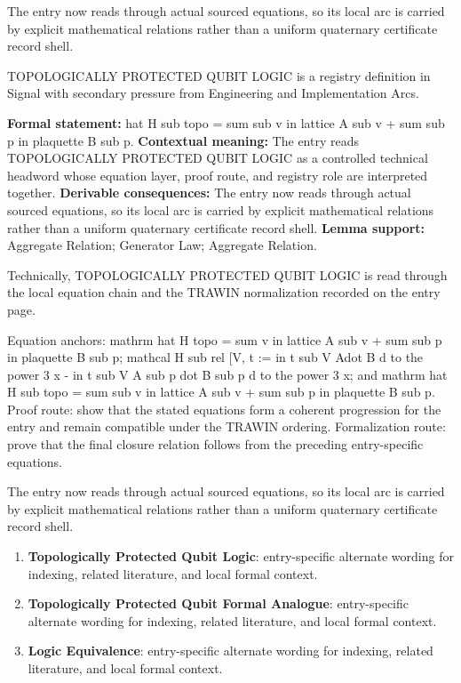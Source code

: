 The entry now reads through actual sourced equations, so its local arc is carried by explicit mathematical relations rather than a uniform quaternary certificate record shell.
\clearpage


\begingroup\small
{}
TOPOLOGICALLY PROTECTED QUBIT LOGIC is a registry definition in Signal with secondary pressure from Engineering and Implementation Arcs.

\begingroup\footnotesize\setlength{\emergencystretch}{3em}\sloppy
\textbf{Formal statement:} hat H sub topo = sum sub v in lattice A sub v + sum sub p in plaquette B sub p. \textbf{Contextual meaning:} The entry reads TOPOLOGICALLY PROTECTED QUBIT LOGIC as a controlled technical headword whose equation layer, proof route, and registry role are interpreted together. \textbf{Derivable consequences:} The entry now reads through actual sourced equations, so its local arc is carried by explicit mathematical relations rather than a uniform quaternary certificate record shell. \textbf{Lemma support:} Aggregate Relation; Generator Law; Aggregate Relation.\par
\endgroup

Technically, TOPOLOGICALLY PROTECTED QUBIT LOGIC is read through the local equation chain and the TRAWIN normalization recorded on the entry page.

Equation anchors: mathrm hat H topo = sum v in lattice A sub v + sum sub p in plaquette B sub p; mathcal H sub rel [V, t := in t sub V Adot B d to the power 3 x - in t sub V A sub p dot B sub p d to the power 3 x; and mathrm hat H sub topo = sum sub v in lattice A sub v + sum sub p in plaquette B sub p. Proof route: show that the stated equations form a coherent progression for the entry and remain compatible under the TRAWIN ordering. Formalization route: prove that the final closure relation follows from the preceding entry-specific equations.

The entry now reads through actual sourced equations, so its local arc is carried by explicit mathematical relations rather than a uniform quaternary certificate record shell.
\endgroup

\begin{enumerate}[leftmargin=1.6em,itemsep=6pt,topsep=4pt]
\item \textbf{Topologically Protected Qubit Logic}: entry-specific alternate wording for indexing, related literature, and local formal context.
\item \textbf{Topologically Protected Qubit Formal Analogue}: entry-specific alternate wording for indexing, related literature, and local formal context.
\item \textbf{Logic Equivalence}: entry-specific alternate wording for indexing, related literature, and local formal context.
\end{enumerate}

